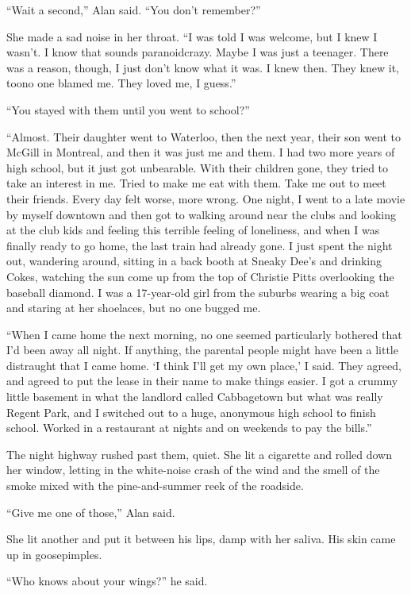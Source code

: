 ``Wait a second,'' Alan said.  ``You don't remember?''

She made a sad noise in her throat.  ``I was told I was welcome, but I
knew I wasn't.  I know that sounds paranoid\dash{}crazy.  Maybe I was just
a teenager.  There was a reason, though, I just don't know what it
was.  I knew then.  They knew it, too\dash{}no one blamed me.  They loved
me, I guess.''

``You stayed with them until you went to school?''

``Almost.  Their daughter went to Waterloo, then the next year, their
son went to McGill in Montreal, and then it was just me and them.  I
had two more years of high school, but it just got unbearable.  With
their children gone, they tried to take an interest in me.  Tried to
make me eat with them.  Take me out to meet their friends.  Every day
felt worse, more wrong.  One night, I went to a late movie by myself
downtown and then got to walking around near the clubs and looking at
the club kids and feeling this terrible feeling of loneliness, and
when I was finally ready to go home, the last train had already gone. 
I just spent the night out, wandering around, sitting in a back booth
at Sneaky Dee's and drinking Cokes, watching the sun come up from the
top of Christie Pitts overlooking the baseball diamond.  I was a
17-year-old girl from the suburbs wearing a big coat and staring at
her shoelaces, but no one bugged me.

``When I came home the next morning, no one seemed particularly
bothered that I'd been away all night.  If anything, the parental
people might have been a little distraught that I came home.  `I think
I'll get my own place,' I said.  They agreed, and agreed to put the
lease in their name to make things easier.  I got a crummy little
basement in what the landlord called Cabbagetown but what was really
Regent Park, and I switched out to a huge, anonymous high school to
finish school.  Worked in a restaurant at nights and on weekends to
pay the bills.''

The night highway rushed past them, quiet.  She lit a cigarette and
rolled down her window, letting in the white-noise crash of the wind
and the smell of the smoke mixed with the pine-and-summer reek of the
roadside.

``Give me one of those,'' Alan said.

She lit another and put it between his lips, damp with her saliva. 
His skin came up in goosepimples.

``Who knows about your wings?'' he said.

